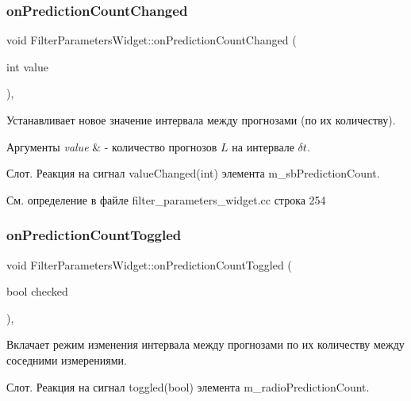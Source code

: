 \subsubsection{\texorpdfstring{on\+Prediction\+Count\+Changed}{onPredictionCountChanged}}
{\footnotesize\ttfamily void Filter\+Parameters\+Widget\+::on\+Prediction\+Count\+Changed (\begin{DoxyParamCaption}\item[{int}]{value }\end{DoxyParamCaption})\hspace{0.3cm}{\ttfamily [private]}, {\ttfamily [slot]}}



Устанавливает новое значение интервала между прогнозами (по их количеству). 


\begin{DoxyParams}{Аргументы}
{\em value} & -\/ количество прогнозов $L$ на интервале $\delta t$.\\
\hline
\end{DoxyParams}
Слот. Реакция на сигнал value\+Changed(int) элемента m\+\_\+sb\+Prediction\+Count. 

См. определение в файле filter\+\_\+parameters\+\_\+widget.\+cc строка 254

\hypertarget{class_filter_parameters_widget_af00a1550252f080c7647f3fbf684587b}{}\label{class_filter_parameters_widget_af00a1550252f080c7647f3fbf684587b} 
\subsubsection{\texorpdfstring{on\+Prediction\+Count\+Toggled}{onPredictionCountToggled}}
{\footnotesize\ttfamily void Filter\+Parameters\+Widget\+::on\+Prediction\+Count\+Toggled (\begin{DoxyParamCaption}\item[{bool}]{checked }\end{DoxyParamCaption})\hspace{0.3cm}{\ttfamily [private]}, {\ttfamily [slot]}}



Вклачает режим изменения интервала между прогнозами по их количеству между соседними измерениями. 

Слот. Реакция на сигнал toggled(bool) элемента m\+\_\+radio\+Prediction\+Count. 

